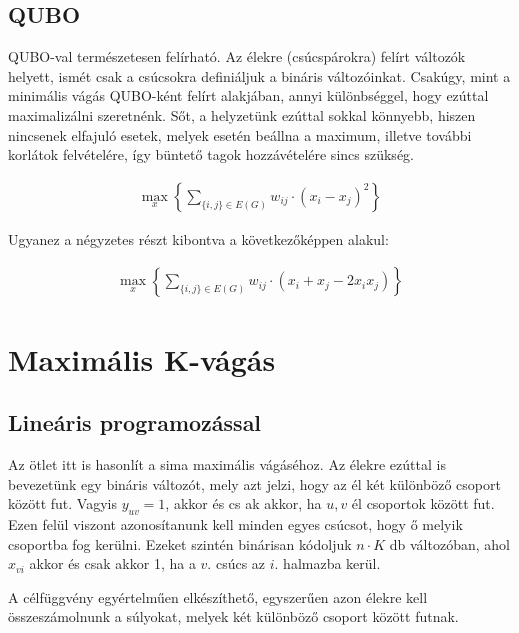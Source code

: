 \subsection{QUBO}

QUBO-val természetesen felírható. Az élekre (csúcspárokra) felírt változók helyett, ismét csak a csúcsokra definiáljuk a bináris változóinkat. Csakúgy, mint a minimális vágás QUBO-ként felírt alakjában, annyi különbséggel, hogy ezúttal maximalizálni szeretnénk. Sőt, a helyzetünk ezúttal sokkal könnyebb, hiszen nincsenek elfajuló esetek, melyek esetén beállna a maximum, illetve további korlátok felvételére, így büntető tagok hozzávételére sincs szükség.

\begin{align}
	\max_{x} \left\{ \sum_{\{i,j\} \in E(G)}{w_{ij} \cdot (x_i-x_j)^2}\right\}
\end{align}

Ugyanez a négyzetes részt kibontva a következőképpen alakul:

\begin{align}
	\max_{x} \left\{ \sum_{\{i,j\} \in E(G)}{w_{ij} \cdot (x_i+x_j-2 x_i x_j)}\right\}
\end{align}


\section{Maximális K-vágás}


\subsection{Lineáris programozással}

Az ötlet itt is hasonlít a sima maximális vágáséhoz. Az élekre ezúttal is bevezetünk egy bináris változót, mely azt jelzi, hogy az él két különböző csoport között fut. Vagyis $y_{uv}=1$, akkor és cs
ak akkor, ha $u, v$ él csoportok között fut. Ezen felül viszont azonosítanunk kell minden egyes csúcsot, hogy ő melyik csoportba fog kerülni. Ezeket szintén binárisan kódoljuk $n \cdot K$ db változóban, ahol $x_{vi}$ akkor és csak akkor 1, ha a $v.$ csúcs az $i.$ halmazba kerül. 

A célfüggvény egyértelműen elkészíthető, egyszerűen azon élekre kell összeszámolnunk a súlyokat, melyek két különböző csoport között futnak.

